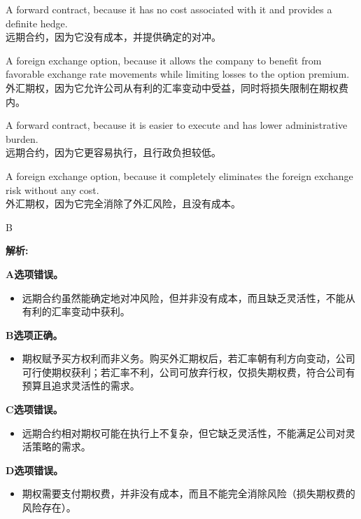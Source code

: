 \documentclass{article}
\newenvironment{explanation}
{\textbf{解析:}\par}
{\par}
\begin{document}
    \begin{choices}
        \item A forward contract, because it has no cost associated with it and provides a definite hedge.\\
        远期合约，因为它没有成本，并提供确定的对冲。
        \item A foreign exchange option, because it allows the company to benefit from favorable exchange rate movements while limiting losses to the option premium.\\
        外汇期权，因为它允许公司从有利的汇率变动中受益，同时将损失限制在期权费内。
        \item A forward contract, because it is easier to execute and has lower administrative burden.\\
        远期合约，因为它更容易执行，且行政负担较低。
        \item A foreign exchange option, because it completely eliminates the foreign exchange risk without any cost.\\
        外汇期权，因为它完全消除了外汇风险，且没有成本。
    \end{choices}
    
    \begin{correctanswer}
    B
    \end{correctanswer}
    
    \begin{explanation}
    \textbf{A选项错误。}
    \begin{itemize}
    \item 远期合约虽然能确定地对冲风险，但并非没有成本，而且缺乏灵活性，不能从有利的汇率变动中获利。
    \end{itemize}
    \textbf{B选项正确。}
    \begin{itemize}
    \item 期权赋予买方权利而非义务。购买外汇期权后，若汇率朝有利方向变动，公司可行使期权获利；若汇率不利，公司可放弃行权，仅损失期权费，符合公司有预算且追求灵活性的需求。
    \end{itemize}
    \textbf{C选项错误。}
    \begin{itemize}
    \item 远期合约相对期权可能在执行上不复杂，但它缺乏灵活性，不能满足公司对灵活策略的需求。
    \end{itemize}
    \textbf{D选项错误。}
    \begin{itemize}
    \item 期权需要支付期权费，并非没有成本，而且不能完全消除风险（损失期权费的风险存在）。
    \end{itemize}
    \end{explanation}
    
\end{document}
